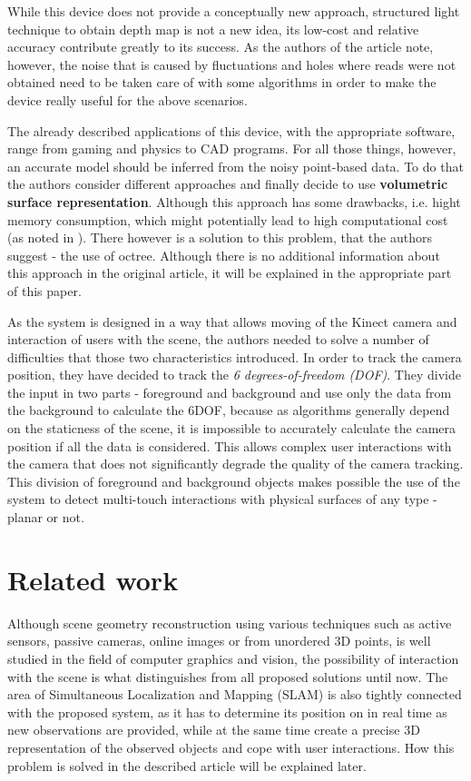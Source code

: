 \documentclass[12pt, a4paper]{article}
\theoremstyle{plain}
\begin{document}
  While this device does not provide a conceptually new approach, structured
  light technique to obtain depth map is not a new idea, its low-cost and
  relative accuracy contribute greatly to its success. As the authors of the
  article note, however, the noise that is caused by fluctuations and holes
  where reads were not obtained need to be taken care of with some algorithms in
  order to make the device really useful for the above scenarios. 

  The already described applications of this device, with the appropriate
  software, range from gaming and physics to CAD programs. For all those things,
  however, an accurate model should be inferred from the noisy point-based data.
  To do that the authors consider different approaches and finally decide to use 
  \textbf{volumetric surface representation}. Although this approach has some 
  drawbacks, i.e. hight memory consumption, which might potentially lead to high
  computational cost (as noted in
  \cite{representaion-and-rendering-of-implicit-surfaces}). There however is a
  solution to this problem, that the authors suggest - the use of octree.
  Although there is no additional information about this approach in the
  original article, it will be explained in the appropriate part of this paper. 

  As the system is designed in a way that allows moving of the Kinect camera and
  interaction of users with the scene, the authors needed to solve a number of
  difficulties that those two characteristics introduced. In order to track the
  camera position, they have decided to track the \emph{6 degrees-of-freedom
  (DOF)}. They divide the input in two parts - foreground and background and use
  only the data from the background to calculate the 6DOF, because as algorithms
  generally depend on the staticness of the scene, it is impossible to
  accurately calculate the camera position if all the data is considered. This
  allows complex user interactions with the camera that does not significantly
  degrade the quality of the camera tracking. This division of foreground and
  background objects makes possible the use of the system to detect multi-touch
  interactions with physical surfaces of any type - planar or not.


\section{Related work} %
\label{sec:Related work}
  Although scene geometry reconstruction using various techniques such as active
  sensors, passive cameras, online images or from unordered 3D points, is well
  studied in the field of computer graphics and vision, the possibility of
  interaction with the scene is what distinguishes \cite{kinectfusion} from all
  proposed solutions until now. The area of Simultaneous Localization and
  Mapping (SLAM) is also tightly connected with the proposed system, as it has
  to determine its position on in real time as new observations are provided,
  while at the same time create a precise 3D representation of the observed
  objects and cope with user interactions. How this problem is solved in the
  described article will be explained later.
\end{document}
